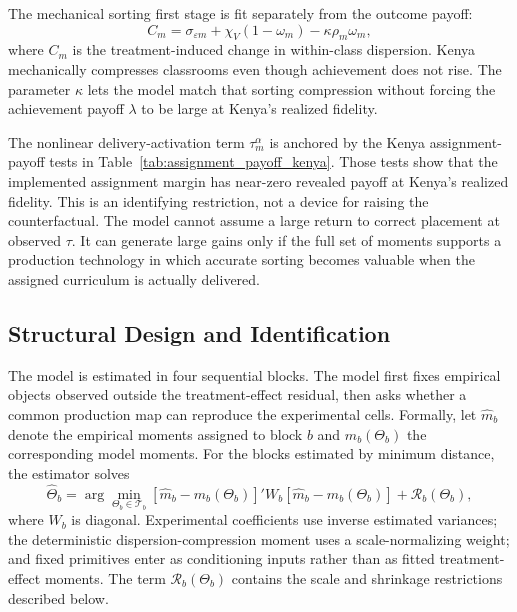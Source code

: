\documentclass[11pt]{article}
\begin{document}
The mechanical sorting first stage is fit separately from the outcome payoff:
\begin{equation}
\label{eq:str_dispersion_map}
C_m = \sigma_{\varepsilon m} + \chi_V(1-\omega_m) - \kappa\rho_m\omega_m,
\end{equation}
where $C_m$ is the treatment-induced change in within-class dispersion. Kenya mechanically compresses classrooms even though achievement does not rise. The parameter $\kappa$ lets the model match that sorting compression without forcing the achievement payoff $\lambda$ to be large at Kenya's realized fidelity.

The nonlinear delivery-activation term $\tau_m^\alpha$ is anchored by the Kenya assignment-payoff tests in Table~\ref{tab:assignment_payoff_kenya}. Those tests show that the implemented assignment margin has near-zero revealed payoff at Kenya's realized fidelity. This is an identifying restriction, not a device for raising the counterfactual. The model cannot assume a large return to correct placement at observed $\tau$. It can generate large gains only if the full set of moments supports a production technology in which accurate sorting becomes valuable when the assigned curriculum is actually delivered.

\subsection{Structural Design and Identification}
\label{subsec:struct_blocks}

The model is estimated in four sequential blocks. The model first fixes empirical objects observed outside the treatment-effect residual, then asks whether a common production map can reproduce the experimental cells. Formally, let $\hat{m}_b$ denote the empirical moments assigned to block $b$ and $m_b(\Theta_b)$ the corresponding model moments. For the blocks estimated by minimum distance, the estimator solves
\begin{equation}
\label{eq:md_objective}
\hat{\Theta}_b
= \arg\min_{\Theta_b \in \mathcal{T}_b}
\left[\hat{m}_b - m_b(\Theta_b)\right]'
W_b
\left[\hat{m}_b - m_b(\Theta_b)\right]
+ \mathcal{R}_b(\Theta_b),
\end{equation}
where $W_b$ is diagonal. Experimental coefficients use inverse estimated variances; the deterministic dispersion-compression moment uses a scale-normalizing weight; and fixed primitives enter as conditioning inputs rather than as fitted treatment-effect moments. The term $\mathcal{R}_b(\Theta_b)$ contains the scale and shrinkage restrictions described below.
\end{document}
